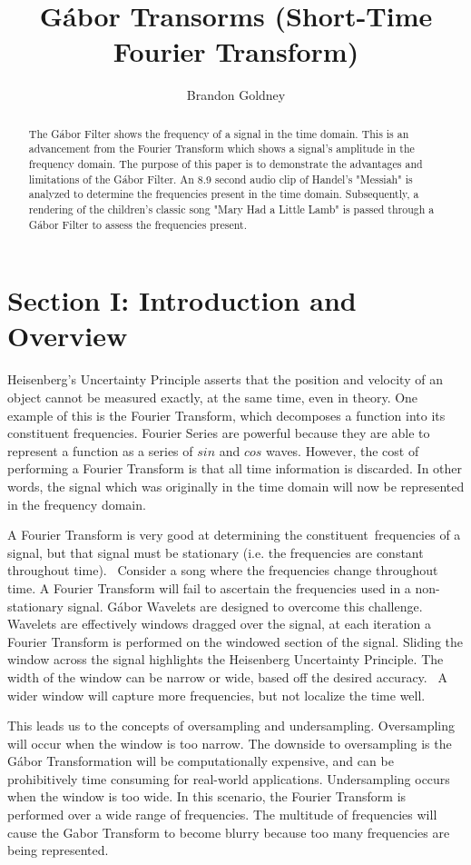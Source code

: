 \documentclass{cup-pan}
\title{Gábor Transorms (Short-Time Fourier Transform)}
\author[1]{\normalsize Brandon Goldney}
\affil[1]{Department of Applied Mathematics, University of Washington, Email: \url{Goldney@uw.edu}}
\begin{document}
\maketitle

\begin{abstract}
The Gábor Filter shows the frequency of a signal in the time domain.  This is an advancement from the Fourier Transform which shows a signal's amplitude in the frequency domain.  The purpose of this paper is to demonstrate the advantages and limitations of the Gábor Filter.  An 8.9 second audio clip of Handel's "Messiah" is analyzed to determine the frequencies present in the time domain.  Subsequently, a rendering of the children's classic song "Mary Had a Little Lamb" is passed through a Gábor Filter to assess the frequencies present.
\end{abstract}

\section{Section I: Introduction and Overview}
Heisenberg's Uncertainty Principle asserts that the position and velocity of an object cannot be measured exactly, at the same time, even in theory. One example of this is the Fourier Transform, which decomposes a function into its constituent frequencies. Fourier Series are powerful because they are able to represent a function as a series of $sin$ and $cos$ waves. However, the cost of performing a Fourier Transform is that all time information is discarded.  In other words, the signal which was originally in the time domain will now be represented in the frequency domain.

\vskip 0.1in
\noindent
A Fourier Transform is very good at determining the constituent frequencies of a signal, but that signal must be stationary (i.e. the frequencies are constant throughout time).  Consider a song where the frequencies change throughout time. A Fourier Transform will fail to ascertain the frequencies used in a non-stationary signal. Gábor Wavelets are designed to overcome this challenge.  Wavelets are effectively windows dragged over the signal, at each iteration a Fourier Transform is performed on the windowed section of the signal. Sliding the window across the signal highlights the Heisenberg Uncertainty Principle. The width of the window can be narrow or wide, based off the desired accuracy.  A wider window will capture more frequencies, but not localize the time well. 

\vskip 0.1in
\noindent
This leads us to the concepts of oversampling and undersampling.  Oversampling will occur when the window is too narrow.  The downside to oversampling is the Gábor Transformation will be computationally expensive, and can be prohibitively time consuming for real-world applications.  Undersampling occurs when the window is too wide.  In this scenario, the Fourier Transform is performed over a wide range of frequencies.  The multitude of frequencies will cause the Gabor Transform to become blurry because too many frequencies are being represented.  
\end{document}
